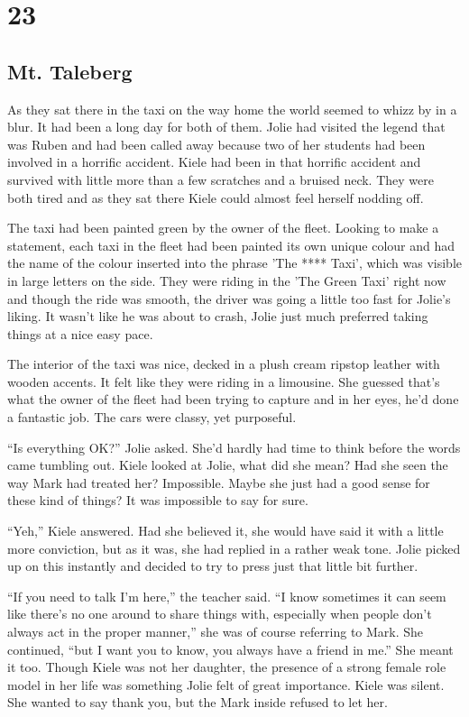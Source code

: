 \chapter{23}
\section{Mt. Taleberg}


As they sat there in the taxi on the way home the world seemed to whizz by in a blur.  It had been a long day for both of them.  Jolie had visited the legend that was Ruben and had been called away because two of her students had been involved in a horrific accident.  Kiele had been in that horrific accident and survived with little more than a few scratches and a bruised neck.  They were both tired and as they sat there Kiele could almost feel herself nodding off.  

The taxi had been painted green by the owner of the fleet.  Looking to make a statement, each taxi in the fleet had been painted its own unique colour and had the name of the colour inserted into the phrase 'The **** Taxi', which was visible in large letters on the side.  They were riding in the 'The Green Taxi' right now and though the ride was smooth, the driver was going a little too fast for Jolie's liking.  It wasn't like he was about to crash, Jolie just much preferred taking things at a nice easy pace.  

The interior of the taxi was nice, decked in a plush cream ripstop leather with wooden accents.  It felt like they were riding in a limousine.  She guessed that's what the owner of the fleet had been trying to capture and in her eyes, he'd done a fantastic job.  The cars were classy, yet purposeful.

``Is everything OK?'' Jolie asked.  She'd hardly had time to think before the words came tumbling out.  Kiele looked at Jolie, what did she mean?  Had she seen the way Mark had treated her?  Impossible.  Maybe she just had a good sense for these kind of things?  It was impossible to say for sure.

``Yeh,'' Kiele answered.  Had she believed it, she would have said it with a little more conviction, but as it was, she had replied in a rather weak tone.  Jolie picked up on this instantly and decided to try to press just that little bit further.

``If you need to talk I'm here,'' the teacher said.  ``I know sometimes it can seem like there's no one around to share things with, especially when people don't always act in the proper manner,'' she was of course referring to Mark.  She continued, ``but I want you to know, you always have a friend in me.''  She meant it too.  Though Kiele was not her daughter, the presence of a strong female role model in her life was something Jolie felt of great importance.  Kiele was silent.  She wanted to say thank you, but the Mark inside refused to let her.

